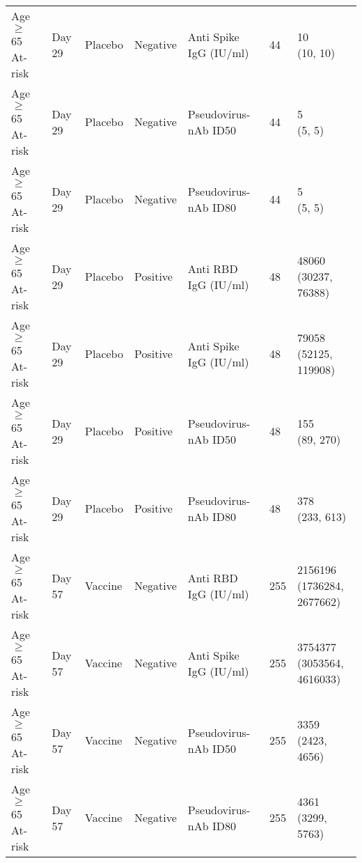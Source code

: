 \documentclass[]{book}
\theoremstyle{definition}
\theoremstyle{definition}
\theoremstyle{definition}
\newcommand{\1}{\mathbbm{1}}
\begin{document}
\begin{landscape}
\begin{ThreePartTable}
\begin{longtable}[t]{>{\raggedright\arraybackslash}p{7cm}llllll}
\hspace{1em}Age $\geq$ 65 At-risk & Day 29 & Placebo & Negative & Anti Spike IgG (IU/ml) & 44 & \makecell[l]{10\\(10, 10)}\\
\hspace{1em}Age $\geq$ 65 At-risk & Day 29 & Placebo & Negative & Pseudovirus-nAb ID50 & 44 & \makecell[l]{5\\(5, 5)}\\
\hspace{1em}Age $\geq$ 65 At-risk & Day 29 & Placebo & Negative & Pseudovirus-nAb ID80 & 44 & \makecell[l]{5\\(5, 5)}\\
\hspace{1em}Age $\geq$ 65 At-risk & Day 29 & Placebo & Positive & Anti RBD IgG (IU/ml) & 48 & \makecell[l]{48060\\(30237, 76388)}\\
\hspace{1em}Age $\geq$ 65 At-risk & Day 29 & Placebo & Positive & Anti Spike IgG (IU/ml) & 48 & \makecell[l]{79058\\(52125, 119908)}\\
\hspace{1em}Age $\geq$ 65 At-risk & Day 29 & Placebo & Positive & Pseudovirus-nAb ID50 & 48 & \makecell[l]{155\\(89, 270)}\\
\hspace{1em}Age $\geq$ 65 At-risk & Day 29 & Placebo & Positive & Pseudovirus-nAb ID80 & 48 & \makecell[l]{378\\(233, 613)}\\
\hspace{1em}Age $\geq$ 65 At-risk & Day 57 & Vaccine & Negative & Anti RBD IgG (IU/ml) & 255 & \makecell[l]{2156196\\(1736284, 2677662)}\\
\hspace{1em}Age $\geq$ 65 At-risk & Day 57 & Vaccine & Negative & Anti Spike IgG (IU/ml) & 255 & \makecell[l]{3754377\\(3053564, 4616033)}\\
\hspace{1em}Age $\geq$ 65 At-risk & Day 57 & Vaccine & Negative & Pseudovirus-nAb ID50 & 255 & \makecell[l]{3359\\(2423, 4656)}\\
\hspace{1em}Age $\geq$ 65 At-risk & Day 57 & Vaccine & Negative & Pseudovirus-nAb ID80 & 255 & \makecell[l]{4361\\(3299, 5763)}\\

\end{longtable}
\end{ThreePartTable}
\end{landscape}
\end{document}
